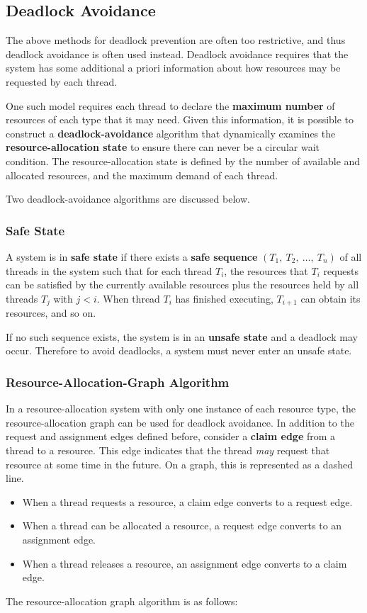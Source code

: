 \documentclass{article}
\begin{document}
\subsection{Deadlock Avoidance}
The above methods for deadlock prevention are often too restrictive,
and thus deadlock avoidance is often used instead. Deadlock avoidance
requires that the system has some additional a priori information about
how resources may be requested by each thread.

One such model requires each thread to declare the \textbf{maximum
number} of resources of each type that it may need. Given this
information, it is possible to construct a \textbf{deadlock-avoidance}
algorithm that dynamically examines the \textbf{resource-allocation
state} to ensure there can never be a circular wait condition. The
resource-allocation state is defined by the number of available and
allocated resources, and the maximum demand of each thread.

Two deadlock-avoidance algorithms are discussed below.
\subsubsection{Safe State}
A system is in \textbf{safe state} if there exists a \textbf{safe
sequence} \(\left( T_1,\: T_2,\: \ldots,\: T_n \right)\) of all threads
in the system such that for each thread \(T_i\), the resources that
\(T_i\) requests can be satisfied by the currently available resources
plus the resources held by all threads \(T_j\) with \(j < i\). When
thread \(T_i\) has finished executing, \(T_{i+1}\) can obtain its
resources, and so on.

If no such sequence exists, the system is in an \textbf{unsafe state}
and a deadlock may occur. Therefore to avoid deadlocks, a system must
never enter an unsafe state.
\subsubsection{Resource-Allocation-Graph Algorithm}
In a resource-allocation system with only one instance of each resource
type, the resource-allocation graph can be used for deadlock avoidance.
In addition to the request and assignment edges defined before,
consider a \textbf{claim edge} from a thread to a resource. This edge
indicates that the thread \textit{may} request that resource at some
time in the future. On a graph, this is represented as a dashed line.
\begin{itemize}
    \item When a thread requests a resource, a claim edge converts to a
          request edge.
    \item When a thread can be allocated a resource, a request edge
          converts to an assignment edge.
    \item When a thread releases a resource, an assignment edge
          converts to a claim edge.
\end{itemize}
The resource-allocation graph algorithm is as follows:
\end{document}
